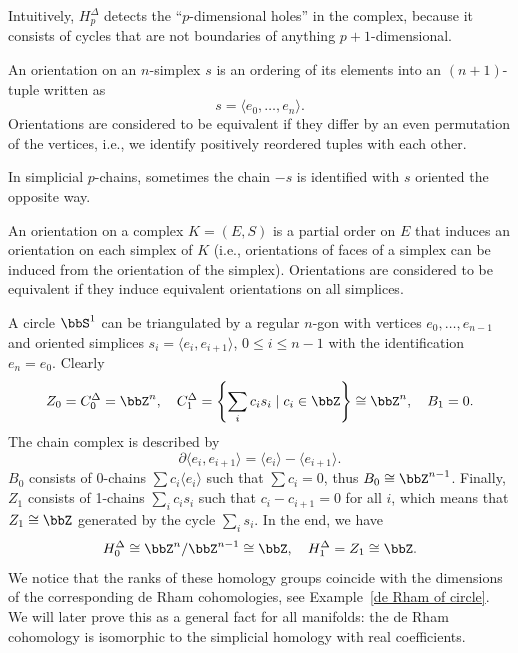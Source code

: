 Intuitively, $H^\Delta_p$ detects the ``$p$-dimensional holes'' in the complex, because it consists of cycles that are not boundaries of anything $p+1$-dimensional.

\begin{defn}
    An orientation on an $n$-simplex $s$ is an ordering of its elements into an $(n+1)$-tuple written as \[s=\langle e_0,\ldots,e_n\rangle.\]
    Orientations are considered to be equivalent if they differ by an even permutation of the vertices, i.e., we identify positively reordered tuples with each other. 
    
    In simplicial $p$-chains, sometimes the chain $-s$ is identified with $s$ oriented the opposite way.
    
    An orientation on a complex $K=(E,S)$ is a partial order on $E$ that induces an orientation on each simplex of $K$ (i.e., orientations of faces of a simplex can be induced from the orientation of the simplex). Orientations are considered to be equivalent if they induce equivalent orientations on all simplices.
\end{defn}

\begin{example}
    A circle $\bbS^1$ can be triangulated by a regular $n$-gon with vertices  $e_0,\ldots,e_{n-1}$ and oriented simplices $s_i=\langle e_i,e_{i+1}\rangle$, $0\leq i\leq n-1$ with the identification $e_n=e_0$. 
    Clearly 
    \[Z_0=C^\Delta_0=\bbZ^n,\quad C^\Delta_1=\left\{\sum_i c_i s_i \mid c_i\in \bbZ\right\}\cong \bbZ^n,\quad B_1=0.\]
    The chain complex is described by 
    \[\partial\langle e_i,e_{i+1}\rangle=\langle e_i\rangle-\langle e_{i+1}\rangle .\]
    $B_0$ consists of 0-chains $\sum c_i \langle e_i\rangle$ such that $\sum c_i=0$, thus $B_0\cong \bbZ^{n-1}$.
    Finally, $Z_1$ consists of 1-chains $\sum_i c_i s_i$ such that $c_i-c_{i+1}=0$ for all $i$, which means that $Z_1\cong \bbZ$ generated by the cycle $\sum_i s_i$. In the end, we have
    \[H^\Delta_0\cong \bbZ^n/\bbZ^{n-1}\cong \bbZ,\quad H^\Delta_1=Z_1\cong \bbZ. \]
    We notice that the ranks of these homology groups coincide with the dimensions of the corresponding de Rham cohomologies, see Example~\ref{de Rham of circle}. We will later prove this as a general fact for all manifolds: the de Rham cohomology is isomorphic to the simplicial homology with real coefficients.
\end{example}


